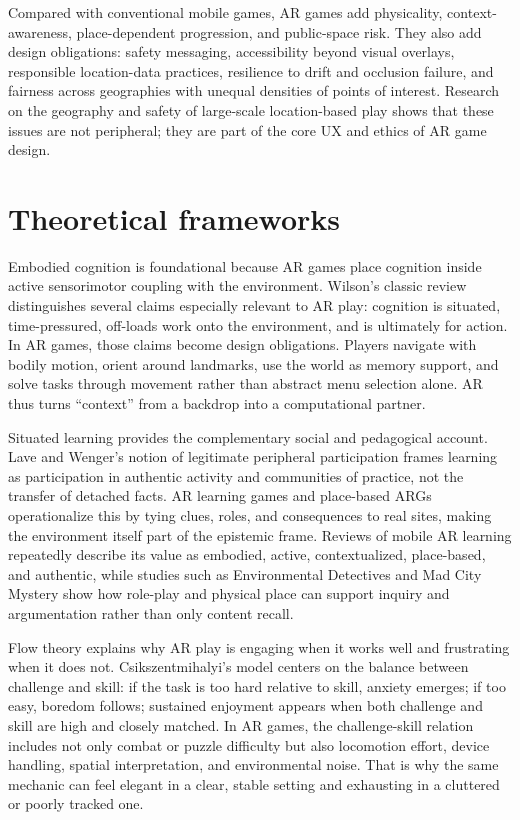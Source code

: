\begin{sloppy}
Compared with conventional mobile games, AR games add physicality, context-awareness, place-dependent progression, and public-space risk. They also add design obligations: safety messaging, accessibility beyond visual overlays, responsible location-data practices, resilience to drift and occlusion failure, and fairness across geographies with unequal densities of points of interest. Research on the geography and safety of large-scale location-based play shows that these issues are not peripheral; they are part of the core UX and ethics of AR game design.

\section*{Theoretical frameworks}
Embodied cognition is foundational because AR games place cognition inside active sensorimotor coupling with the environment. Wilson's classic review distinguishes several claims especially relevant to AR play: cognition is situated, time-pressured, off-loads work onto the environment, and is ultimately for action. In AR games, those claims become design obligations. Players navigate with bodily motion, orient around landmarks, use the world as memory support, and solve tasks through movement rather than abstract menu selection alone. AR thus turns ``context'' from a backdrop into a computational partner.

Situated learning provides the complementary social and pedagogical account. Lave and Wenger's notion of legitimate peripheral participation frames learning as participation in authentic activity and communities of practice, not the transfer of detached facts. AR learning games and place-based ARGs operationalize this by tying clues, roles, and consequences to real sites, making the environment itself part of the epistemic frame. Reviews of mobile AR learning repeatedly describe its value as embodied, active, contextualized, place-based, and authentic, while studies such as Environmental Detectives and Mad City Mystery show how role-play and physical place can support inquiry and argumentation rather than only content recall.

Flow theory explains why AR play is engaging when it works well and frustrating when it does not. Csikszentmihalyi's model centers on the balance between challenge and skill: if the task is too hard relative to skill, anxiety emerges; if too easy, boredom follows; sustained enjoyment appears when both challenge and skill are high and closely matched. In AR games, the challenge-skill relation includes not only combat or puzzle difficulty but also locomotion effort, device handling, spatial interpretation, and environmental noise. That is why the same mechanic can feel elegant in a clear, stable setting and exhausting in a cluttered or poorly tracked one.


\end{sloppy}
